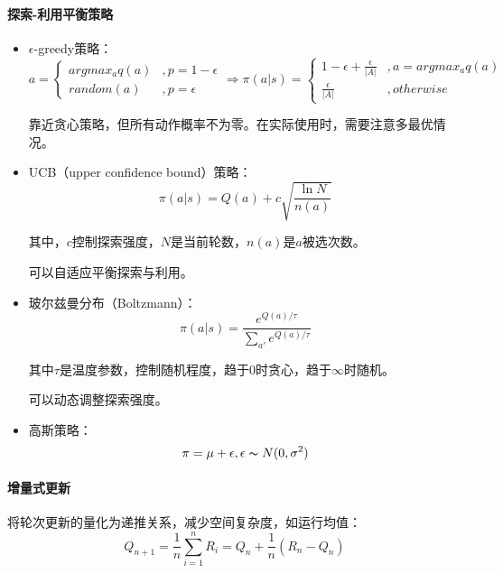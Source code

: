 \documentclass[
12pt, %
a4paper, 
oneside, %
headinclude,footinclude, %
]{scrartcl}
\begin{document}
\paragraph{探索-利用平衡策略}
\begin{itemize}
\item $ \epsilon $-greedy策略：
$$
a = 
\begin{cases} 
argmax_a q(a) &, p = 1 - \epsilon \\
random(a) &, p = \epsilon
\end{cases}
\Rightarrow 
\pi(a|s) = 
\begin{cases} 
1 - \epsilon + \frac{\epsilon}{|A|} &, a = argmax_a q(a) \\
\frac{\epsilon}{|A|} &, otherwise
\end{cases}
$$

靠近贪心策略，但所有动作概率不为零。在实际使用时，需要注意多最优情况。
\item UCB（upper confidence bound）策略：
$$ \pi(a|s) = Q(a) + c\sqrt{\frac{\ln N}{n(a)}} $$

其中，$ c $控制探索强度，$ N $是当前轮数，$ n(a) $是$ a $被选次数。

可以自适应平衡探索与利用。
\item 玻尔兹曼分布（Boltzmann）：
$$ \pi(a|s) = \frac{e^{Q(a)/\tau}}{\sum_{a'} e^{Q(a)/\tau}} $$

其中$ \tau $是温度参数，控制随机程度，趋于$ 0 $时贪心，趋于$ \infty $时随机。

可以动态调整探索强度。
\item 高斯策略：
$$ \pi = \mu + \epsilon, \epsilon \thicksim N(0, \sigma^2) $$
\end{itemize}
\paragraph{增量式更新}
将轮次更新的量化为递推关系，减少空间复杂度，如运行均值：
$$ Q_{n + 1} = \frac{1}{n}\sum_{i = 1}^n R_i = Q_n + \frac{1}{n}(R_n - Q_n) $$
\end{document}
